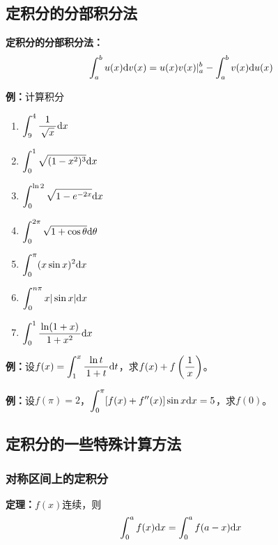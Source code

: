 \subsection{定积分的分部积分法}

\begin{thx}
	{\bf 定积分的分部积分法：}
	$${\displaystyle\int_a^bu(x)\mathrm{d} v(x)=u(x)v(x)|_a^b-\displaystyle\int_a^bv(x)\mathrm{d} u(x)}$$	
\end{thx}

{\bf 例：}计算积分
\begin{enumerate}[(1)]
  \setlength{\itemindent}{1cm}
  \item  $\displaystyle\int_9^4\displaystyle\frac{\,{1}\,}{\,{\sqrt x}\,}\mathrm{d} x$ 
  \item $\displaystyle\int_0^1\sqrt{(1-x^2)^3}\mathrm{d} x$ 
  \item $\displaystyle\int_0^{\ln 2}\sqrt{1-e^{-2x}}\mathrm{d} x$
  \item $\displaystyle\int_0^{2\pi}\sqrt{1+\cos\theta}\mathrm{d}\theta$ 
  \item $\displaystyle\int_0^{\pi}(x\sin x)^2\mathrm{d} x$ 
  \item $\displaystyle\int_0^{n\pi}x|\sin x|\mathrm{d} x$ 
  \item $\displaystyle\int_0^1\displaystyle\frac{\,{\ln(1+x)}\,}{\,{1+x^2}\,}\mathrm{d} x$
\end{enumerate}

{\bf 例：}设$f(x)=\displaystyle\int_1^x\displaystyle\frac{\,{\ln t}\,}{\,{1+t}\,}\mathrm{d} t$，求$f(x)+f
\left(\displaystyle\frac{\,{1}\,}{\,{x}\,}\right)$。

{\bf 例：}设$f(\pi)=2$，$\displaystyle\int_0^{\pi}[f(x)+f''(x)]\sin x\mathrm{d} x=5$，求$f(0)$。

\subsection{定积分的一些特殊计算方法}

\subsubsection{对称区间上的定积分}

\begin{thx}
	{\bf 定理：}$f(x)$连续，则
	$$\displaystyle\int_0^af(x)\mathrm{d} x=\displaystyle\int_0^af(a-x)\mathrm{d} x$$
\end{thx}

